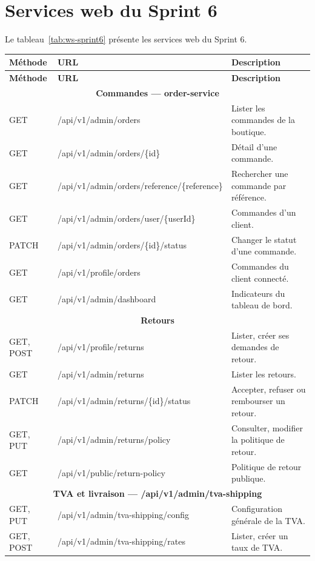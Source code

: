 \section{Services web du Sprint 6}
Le tableau~\ref{tab:ws-sprint6} présente les services web du Sprint 6.
\renewcommand{\arraystretch}{1.15}
\setlength{\tabcolsep}{4pt}
\begin{longtable}{|p{1.5cm}|p{6.8cm}|p{6.2cm}|}
\hline
\textbf{Méthode} & \textbf{URL} & \textbf{Description} \\
\hline
\endfirsthead
\hline
\textbf{Méthode} & \textbf{URL} & \textbf{Description} \\
\hline
\endhead
\multicolumn{3}{|c|}{\textbf{Commandes --- order-service}} \\
\hline
GET & /api/v1/admin/orders & Lister les commandes de la boutique. \\
\hline
GET & /api/v1/admin/orders/\{id\} & Détail d'une commande. \\
\hline
GET & /api/v1/admin/orders/reference/\{reference\} & Rechercher une commande par référence. \\
\hline
GET & /api/v1/admin/orders/user/\{userId\} & Commandes d'un client. \\
\hline
PATCH & /api/v1/admin/orders/\{id\}/status & Changer le statut d'une commande. \\
\hline
GET & /api/v1/profile/orders & Commandes du client connecté. \\
\hline
GET & /api/v1/admin/dashboard & Indicateurs du tableau de bord. \\
\hline
\multicolumn{3}{|c|}{\textbf{Retours}} \\
\hline
GET, POST & /api/v1/profile/returns & Lister, créer ses demandes de retour. \\
\hline
GET & /api/v1/admin/returns & Lister les retours. \\
\hline
PATCH & /api/v1/admin/returns/\{id\}/status & Accepter, refuser ou rembourser un retour. \\
\hline
GET, PUT & /api/v1/admin/returns/policy & Consulter, modifier la politique de retour. \\
\hline
GET & /api/v1/public/return-policy & Politique de retour publique. \\
\hline
\multicolumn{3}{|c|}{\textbf{TVA et livraison --- /api/v1/admin/tva-shipping}} \\
\hline
GET, PUT & /api/v1/admin/tva-shipping/config & Configuration générale de la TVA. \\
\hline
GET, POST & /api/v1/admin/tva-shipping/rates & Lister, créer un taux de TVA. \\

\end{longtable}
